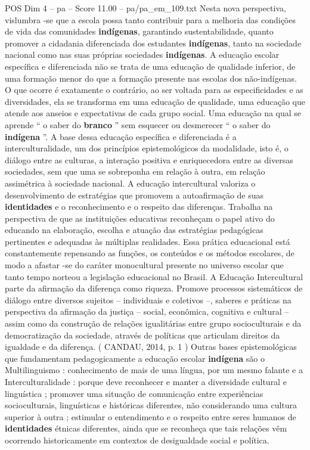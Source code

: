 \begin{textsample}{POS Dim 4 – pa – Score 11.00 – pa/pa\_em\_109.txt}
Nesta nova perspectiva, vislumbra -se que a escola possa tanto contribuir para a melhoria das condições de vida das comunidades \textbf{indígenas}, garantindo sustentabilidade, quanto promover a cidadania diferenciada dos estudantes \textbf{indígenas}, tanto na sociedade nacional como nas suas próprias sociedades \textbf{indígenas}.
A educação escolar específica e diferenciada não se trata de uma educação de qualidade inferior, de uma formação menor do que a formação presente nas escolas dos não-indígenas.
O que ocorre é exatamente o contrário, ao ser voltada para as especificidades e as diversidades, ela se transforma em uma educação de qualidade, uma educação que atende aos anseios e expectativas de cada grupo social.
Uma educação na qual se aprende “ o saber do \textbf{branco} ” sem esquecer ou desmerecer “ o saber do \textbf{indígena} ”.
A base dessa educação específica e diferenciada é a interculturalidade, um dos princípios epistemológicos da modalidade, isto é, o diálogo entre as culturas, a interação positiva e enriquecedora entre as diversas sociedades, sem que uma se sobreponha em relação à outra, em relação assimétrica à sociedade nacional.
A educação intercultural valoriza o desenvolvimento de estratégias que promovem a autoafirmação de suas \textbf{identidades} e o reconhecimento e o respeito das diferenças.
Trabalha na perspectiva de que as instituições educativas reconheçam o papel ativo do educando na elaboração, escolha e atuação das estratégias pedagógicas pertinentes e adequadas às múltiplas realidades.
Essa prática educacional está constantemente repensando as funções, os conteúdos e os métodos escolares, de modo a afastar -se do caráter monocultural presente no universo escolar que tanto tempo norteou a legislação educacional no Brasil.
A Educação Intercultural parte da afirmação da diferença como riqueza.
Promove processos sistemáticos de diálogo entre diversos sujeitos – individuais e coletivos –, saberes e práticas na perspectiva da afirmação da justiça – social, econômica, cognitiva e cultural – assim como da construção de relações igualitárias entre grupo socioculturais e da democratização da sociedade, através de políticas que articulam direitos da igualdade e da diferença. ( CANDAU, 2014, p. 1 ) Outras bases epistemológicas que fundamentam pedagogicamente a educação escolar \textbf{indígena} são o Multilinguismo : conhecimento de mais de uma língua, por um mesmo falante e a Interculturalidade : porque deve reconhecer e manter a diversidade cultural e linguística ; promover uma situação de comunicação entre experiências socioculturais, linguísticas e históricas diferentes, não considerando uma cultura superior à outra ; estimular o entendimento e o respeito entre seres humanos de \textbf{identidades} étnicas diferentes, ainda que se reconheça que tais relações vêm ocorrendo historicamente em contextos de desigualdade social e política.

\end{textsample}
